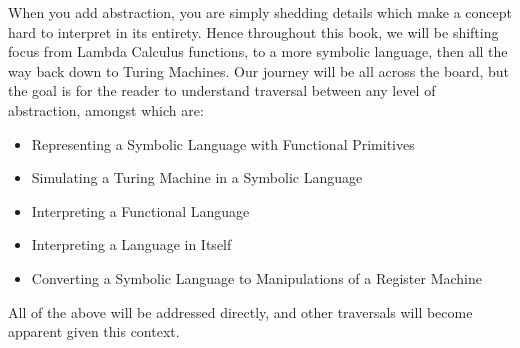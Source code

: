 \documentclass[11pt]{article}
\begin{document}
When you add abstraction, you are simply shedding details which make a concept hard to interpret in its entirety. Hence throughout this book, we will be shifting focus from Lambda Calculus functions, to a more symbolic language, then all the way back down to Turing Machines. Our journey will be all across the board, but the goal is for the reader to understand traversal between any level of abstraction, amongst which are:

\begin{itemize}
  \item Representing a Symbolic Language with Functional Primitives
  \item Simulating a Turing Machine in a Symbolic Language
  \item Interpreting a Functional Language
  \item Interpreting a Language in Itself
  \item Converting a Symbolic Language to Manipulations of a Register Machine
\end{itemize}

All of the above will be addressed directly, and other traversals will become apparent given this context.
\end{document}
